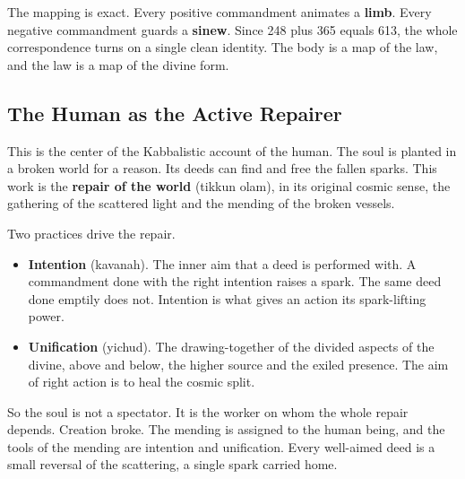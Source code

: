 The mapping is exact. Every positive commandment animates a \textbf{limb}. Every
negative commandment guards a \textbf{sinew}. Since 248 plus 365 equals 613, the
whole correspondence turns on a single clean identity. The body is a map of the
law, and the law is a map of the divine form.

\subsection{The Human as the Active Repairer}

This is the center of the Kabbalistic account of the human. The soul is planted in a
broken world for a reason. Its deeds can find and free the fallen sparks. This
work is the \textbf{repair of the world} (tikkun olam), in its original cosmic
sense, the gathering of the scattered light and the mending of the broken vessels.

Two practices drive the repair.

\begin{itemize}
 \item \textbf{Intention} (kavanah). The inner aim that a deed is performed
 with. A commandment done with the right intention raises a spark. The same
 deed done emptily does not. Intention is what gives an action its
 spark-lifting power.
 \item \textbf{Unification} (yichud). The drawing-together of the divided
 aspects of the divine, above and below, the higher source and the exiled
 presence. The aim of right action is to heal the cosmic split.
\end{itemize}

So the soul is not a spectator. It is the worker on whom the whole repair depends.
Creation broke. The mending is assigned to the human being, and the tools of the
mending are intention and unification. Every well-aimed deed is a small reversal of
the scattering, a single spark carried home.
